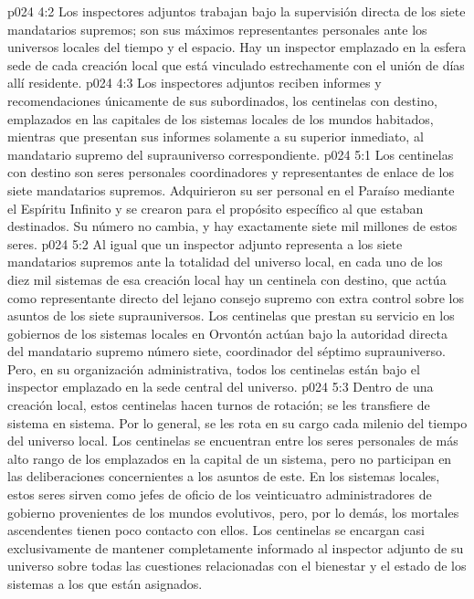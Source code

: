 \vs p024 4:2 Los inspectores adjuntos trabajan bajo la supervisión directa de los siete mandatarios supremos; son sus máximos representantes personales ante los universos locales del tiempo y el espacio. Hay un inspector emplazado en la esfera sede de cada creación local que está vinculado estrechamente con el unión de días allí residente.
\vs p024 4:3 Los inspectores adjuntos reciben informes y recomendaciones únicamente de sus subordinados, los centinelas con destino, emplazados en las capitales de los sistemas locales de los mundos habitados, mientras que presentan sus informes solamente a su superior inmediato, al mandatario supremo del suprauniverso correspondiente.
\vs p024 5:1 Los centinelas con destino son seres personales coordinadores y representantes de enlace de los siete mandatarios supremos. Adquirieron su ser personal en el Paraíso mediante el Espíritu Infinito y se crearon para el propósito específico al que estaban destinados. Su número no cambia, y hay exactamente siete mil millones de estos seres.
\vs p024 5:2 Al igual que un inspector adjunto representa a los siete mandatarios supremos ante la totalidad del universo local, en cada uno de los diez mil sistemas de esa creación local hay un centinela con destino, que actúa como representante directo del lejano consejo supremo con extra control sobre los asuntos de los siete suprauniversos. Los centinelas que prestan su servicio en los gobiernos de los sistemas locales en Orvontón actúan bajo la autoridad directa del mandatario supremo número siete, coordinador del séptimo suprauniverso. Pero, en su organización administrativa, todos los centinelas están bajo el inspector emplazado en la sede central del universo.
\vs p024 5:3 Dentro de una creación local, estos centinelas hacen turnos de rotación; se les transfiere de sistema en sistema. Por lo general, se les rota en su cargo cada milenio del tiempo del universo local. Los centinelas se encuentran entre los seres personales de más alto rango de los emplazados en la capital de un sistema, pero no participan en las deliberaciones concernientes a los asuntos de este. En los sistemas locales, estos seres sirven como jefes de oficio de los veinticuatro administradores de gobierno provenientes de los mundos evolutivos, pero, por lo demás, los mortales ascendentes tienen poco contacto con ellos. Los centinelas se encargan casi exclusivamente de mantener completamente informado al inspector adjunto de su universo sobre todas las cuestiones relacionadas con el bienestar y el estado de los sistemas a los que están asignados.
